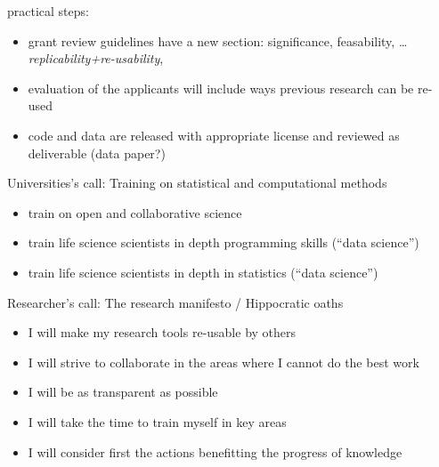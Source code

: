 \documentclass[ignorenonframetext,]{beamer}
\begin{document}
\begin{frame}{practical steps:}

\begin{itemize}[<+->]
\itemsep1pt\parskip0pt
\item
  grant review guidelines have a new section: significance, feasability,
  \ldots{} \emph{replicability+re-usability},
\item
  evaluation of the applicants will include ways previous research can
  be re-used
\item
  code and data are released with appropriate license and reviewed as
  deliverable (data paper?)
\end{itemize}

\end{frame}

\begin{frame}{Universities's call: Training on statistical and
computational methods}

\begin{itemize}[<+->]
\itemsep1pt\parskip0pt
\item
  train on open and collaborative science
\item
  train life science scientists in depth programming skills (``data
  science'')
\item
  train life science scientists in depth in statistics (``data
  science'')
\end{itemize}

\end{frame}

\begin{frame}{Researcher's call: The research manifesto / Hippocratic
oaths}

\begin{itemize}[<+->]
\itemsep1pt\parskip0pt
\item
  I will make my research tools re-usable by others
\item
  I will strive to collaborate in the areas where I cannot do the best
  work
\item
  I will be as transparent as possible
\item
  I will take the time to train myself in key areas
\item
  I will consider first the actions benefitting the progress of
  knowledge
\end{itemize}

\end{frame}
\end{document}
